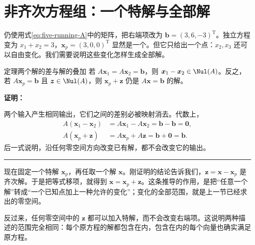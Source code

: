 \documentclass[a4paper,12pt,twoside,openany,fontset=none]{ctexbook}
\newcounter{theorem}[chapter]
\newenvironment{theorem}[1][]{\begin{thmBox}{定理}{#1}}{\end{thmBox}}
\renewenvironment{proof}{
    \par\vspace{0.5em}\noindent
    \textbf{\color{LogicColor} 证明：}
}{
    \hfill \textcolor{LogicColor}{\rule{0.6em}{0.6em}} \par
}
\numberwithin{equation}{chapter}
\begin{document}
\section{非齐次方程组：一个特解与全部解}
\label{sec:five-nonhomogeneous}

仍使用式\eqref{eq:five-running-A}中的矩阵，把右端项改为 $\boldsymbol b=(3,6,-3)^{\mathrm T}$。独立方程变为 $x_1+x_2=3$，$\boldsymbol x_p=(3,0,0)^{\mathrm T}$ 显然是一个。但它只给出一个点：$x_2,x_3$ 还可以自由变化。我们需要说明这些变化怎样生成全部解。

\begin{theorem}[两个解的差与解的叠加]
若 $A\boldsymbol x_1=A\boldsymbol x_2=\boldsymbol b$，则 $\boldsymbol x_1-\boldsymbol x_2\in\Nul(A)$。反之，若 $A\boldsymbol x_p=\boldsymbol b$ 且 $\boldsymbol z\in\Nul(A)$，则 $\boldsymbol x_p+\boldsymbol z$ 仍是 $A\boldsymbol x=\boldsymbol b$ 的解。
\end{theorem}
\begin{proof}
两个输入产生相同输出，它们之间的差别必被映射消去。代数上，
\begin{align}
 A(\boldsymbol x_1-\boldsymbol x_2)
 &=A\boldsymbol x_1-A\boldsymbol x_2
 =\boldsymbol b-\boldsymbol b=\boldsymbol0,\\
 A(\boldsymbol x_p+\boldsymbol z)
 &=A\boldsymbol x_p+A\boldsymbol z
 =\boldsymbol b+\boldsymbol0=\boldsymbol b.
\end{align}
后一式说明，沿任何零空间方向改变已有解，都不会改变它的输出。
\end{proof}

现在固定一个特解 $\boldsymbol x_p$，再任取一个解 $\boldsymbol x$。刚证明的结论告诉我们，$\boldsymbol z=\boldsymbol x-\boldsymbol x_p$ 是齐次解。于是把等式移项，就得到 $\boldsymbol x=\boldsymbol x_p+\boldsymbol z$。这条推导的作用，是把“任意一个解”转成“一个已知点加上一种允许的变化”；变化的全部范围，就是上一节已经求出的零空间。

反过来，任何零空间中的 $\boldsymbol z$ 都可以加入特解，而不会改变右端项。这说明两种描述的范围完全相同：每个原方程的解都包含在内，包含在内的每个向量也确实满足原方程。
\end{document}

